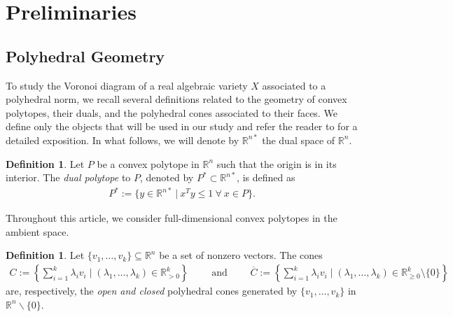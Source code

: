 \documentclass{article}
\numberwithin{theorem}{section}
\theoremstyle{definition}
\newtheorem{definition}[theorem]{Definition}
\theoremstyle{example_contd}
\newcommand{\RR}{\mathbb{R}}
\begin{document}
     
     
     
     
\section{Preliminaries}\label{sec:generalstratify}

\subsection{Polyhedral Geometry}


To study the Voronoi diagram of a real algebraic variety $X$ associated to a polyhedral norm, we recall several definitions related to the geometry of convex polytopes, their duals, and the polyhedral cones associated to their faces. We define only the objects that will be used in our study and refer the reader to \cite{deloera2010,ziegler2012} for a detailed exposition. In what follows, we will denote by $\RR^{n*}$ the dual space of $\RR^n.$



\begin{definition}
	Let $P$ be a convex polytope in $\RR^n$ such that the origin is in its interior. 
	The \emph{dual polytope} to $P$, denoted by $P^*\subset \RR^{n*}$, is defined as
	\begin{align*}
		P^*:=\{y\in\RR^{n*}~|~x^Ty\leq 1~ \forall ~x \in P\}.
	\end{align*}
\end{definition}

Throughout this article, we  consider full-dimensional convex polytopes in the ambient space. 

	\begin{definition}
		Let $\{v_1,\ldots, v_k\} \subseteq \RR^n$ be a set of nonzero vectors. 
		The cones
		\begin{align*}
			C:=\left\{\sum_{i=1}^k\lambda_iv_i \mid (\lambda_1,\ldots,\lambda_k) \in \RR_{> 0}^k \right\} \qquad \text{ and } \qquad \overline{C}:=\left\{\sum_{i=1}^k\lambda_iv_i \mid (\lambda_1,\ldots,\lambda_k)\in\RR_{\geq 0}^k\setminus \{0\}\right\}
				\end{align*}
		are, respectively, the {\em open and closed} polyhedral cones generated by $\{v_1,\ldots, v_k\}$ in $\mathbb{R}^n \backslash \{0\}$.
	\end{definition}
	
\end{document}
